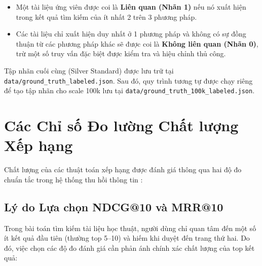 \begin{enumerate}
    \begin{itemize}
        \item Một tài liệu ứng viên được coi là \textbf{Liên quan (Nhãn 1)} nếu nó xuất hiện trong kết quả tìm kiếm của ít nhất 2 trên 3 phương pháp.
        \item Các tài liệu chỉ xuất hiện duy nhất ở 1 phương pháp và không có sự đồng thuận từ các phương pháp khác sẽ được coi là \textbf{Không liên quan (Nhãn 0)}, trừ một số truy vấn đặc biệt được kiểm tra và hiệu chỉnh thủ công.
    \end{itemize}
    Tập nhãn cuối cùng (Silver Standard) được lưu trữ tại \texttt{data/ground\_truth\_labeled.json}. Sau đó, quy trình tương tự được chạy riêng để tạo tập nhãn cho scale 100k lưu tại \texttt{data/ground\_truth\_100k\_labeled.json}.
\end{enumerate}

\section{Các Chỉ số Đo lường Chất lượng Xếp hạng}
Chất lượng của các thuật toán xếp hạng được đánh giá thông qua hai độ đo chuẩn tắc trong hệ thống thu hồi thông tin \cite{manning2008ir}:

\subsection{Lý do Lựa chọn NDCG@10 và MRR@10}
Trong bài toán tìm kiếm tài liệu học thuật, người dùng chỉ quan tâm đến một số ít kết quả đầu tiên (thường top 5--10) và hiếm khi duyệt đến trang thứ hai. Do đó, việc chọn các độ đo đánh giá cần phản ánh chính xác chất lượng của top kết quả:

